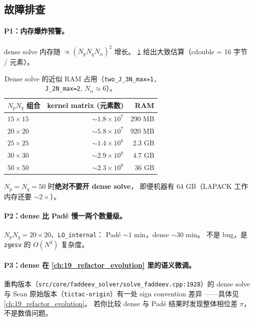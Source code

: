 \subsection{故障排查}
\label{sec:ch20-s5-pitfalls}

\paragraph{P1：内存爆炸预警。}
dense solve 内存随 $\propto (N_p N_q N_\alpha)^2$ 增长。
\cref{tab:ch20-s5-mem} 给出大致估算（cdouble = 16 字节 / 元素）。
\begin{table}[ht]
\centering
\small
\caption{Dense solve 的近似 RAM 占用（\texttt{two\_J\_3N\_max=1, J\_2N\_max=2}, $N_\alpha \approx 6$）。}
\label{tab:ch20-s5-mem}
\begin{tabular}{@{}lrr@{}}
\toprule
$N_p N_q$ 组合 & kernel matrix (元素数) & RAM \\
\midrule
$15 \times 15$  & $\sim 1.8\times 10^7$ & 290 MB  \\
$20 \times 20$  & $\sim 5.8\times 10^7$ & 920 MB  \\
$25 \times 25$  & $\sim 1.4\times 10^8$ & 2.3 GB  \\
$30 \times 30$  & $\sim 2.9\times 10^8$ & 4.7 GB  \\
$50 \times 50$  & $\sim 2.3\times 10^9$ & 36 GB \\
\bottomrule
\end{tabular}
\end{table}
$N_p = N_q = 50$ 时\textbf{绝对不要开 dense solve}，
即便机器有 64 GB（LAPACK 工作内存还要 $\sim 2\times$）。

\paragraph{P2：dense 比 Padé 慢一两个数量级。}
$N_p N_q = 20 \times 20$、\texttt{LO\_internal}：
Padé $\sim 1$ min，dense $\sim 30$ min。
不是 bug，是 \texttt{zgesv} 的 $O(N^3)$ 复杂度。

\paragraph{P3：dense 在 \cref{ch:19_refactor_evolution} 里的语义微调。}
重构版本（\texttt{src/core/faddeev\_solver/solve\_faddeev.cpp:1928}）的 dense solve
与 Sean 原始版本（\texttt{tictac-origin}）有一处 sign convention 差异
——具体见 \cref{ch:19_refactor_evolution}。
若你比较 dense 与 Padé 结果时发现整体相位差 $\pi$，
不是数值问题。

